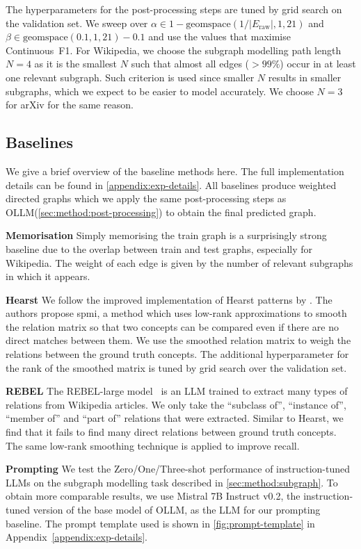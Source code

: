 \documentclass{article}
\newcommand{\name}{{OLLM}\xspace}
\begin{document}
The hyperparameters for the post-processing steps are tuned by grid search on the validation set. We sweep over $\alpha \in 1 - \text{geomspace}(1 / |E_\text{raw}|, 1, 21)$ and $\beta \in \text{geomspace}(0.1, 1, 21) - 0.1$ and use the values that maximise Continuous~F1. For Wikipedia, we choose the subgraph modelling path length $N=4$ as it is the smallest $N$ such that almost all edges ($>99\%$) occur in at least one relevant subgraph. Such criterion is used since smaller $N$ results in smaller subgraphs, which we expect to be easier to model accurately. We choose $N=3$ for arXiv for the same reason. 

\subsection{Baselines}

We give a brief overview of the baseline methods here. The full implementation details can be found in \cref{appendix:exp-details}. All baselines produce weighted directed graphs which we apply the same post-processing steps as \name (\cref{sec:method:post-processing}) to obtain the final predicted graph.

\textbf{Memorisation }
Simply memorising the train graph is a surprisingly strong baseline due to the overlap between train and test graphs, especially for Wikipedia. The weight of each edge is given by the number of relevant subgraphs in which it appears.

\textbf{Hearst }
We follow the improved implementation of Hearst patterns by \citet{roller2018hearst}. The authors propose spmi, a method which uses low-rank approximations to smooth the relation matrix so that two concepts can be compared even if there are no direct matches between them. We use the smoothed relation matrix to weigh the relations between the ground truth concepts. The additional hyperparameter for the rank of the smoothed matrix is tuned by grid search over the validation set.

\textbf{REBEL }
The REBEL-large model~\cite{cabot2021rebel} is an LLM trained to extract many types of relations from Wikipedia articles. We only take the ``subclass of'', ``instance of'', ``member of'' and ``part of'' relations that were extracted. Similar to Hearst, we find that it fails to find many direct relations between ground truth concepts. The same low-rank smoothing technique is applied to improve recall. 

\textbf{Prompting }
We test the Zero/One/Three-shot performance of instruction-tuned LLMs on the subgraph modelling task described in \cref{sec:method:subgraph}. To obtain more comparable results, we use Mistral 7B Instruct v0.2, the instruction-tuned version of the base model of \name, as the LLM for our prompting baseline. The prompt template used is shown in \cref{fig:prompt-template} in Appendix~\ref{appendix:exp-details}.
\end{document}
